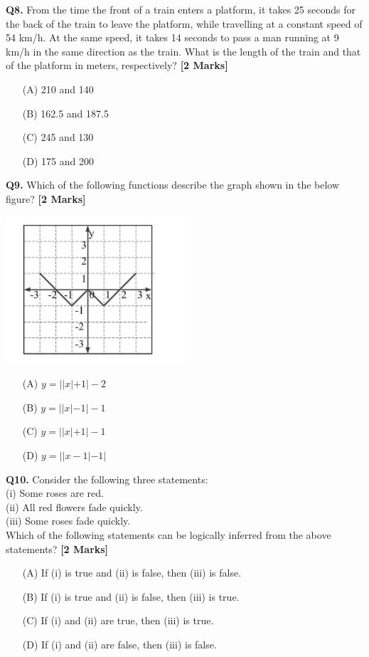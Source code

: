 \documentclass[11pt]{article}
\newcommand{\questionb}[2]{
    \noindent\textbf{Q#2.} #1 \hfill \textbf{[2 Marks]}
}
\begin{document}
\questionb{From the time the front of a train enters a platform, it takes 25 seconds for the back of the train to leave the platform, while travelling at a constant speed of 54 km/h. At the same speed, it takes 14 seconds to pass a man running at 9 km/h in the same direction as the train. What is the length of the train and that of the platform in meters, respectively?}{8}
\begin{enumerate}
    \item[(A)] 210 and 140
    \item[(B)] 162.5 and 187.5
    \item[(C)] 245 and 130
    \item[(D)] 175 and 200
\end{enumerate}
\vspace{0.5cm}

\questionb{Which of the following functions describe the graph shown in the below figure?}{9}
\begin{center}
\includegraphics[width=0.5\textwidth]{figures/9.png}
\end{center}
\begin{enumerate}
    \item[(A)] \( y = ||x| + 1| - 2 \)
    \item[(B)] \( y = ||x| - 1| - 1 \)
    \item[(C)] \( y = ||x| + 1| - 1 \)
    \item[(D)] \( y = ||x - 1| - 1| \)
\end{enumerate}
\vspace{0.5cm}

\questionb{Consider the following three statements: \\
(i) Some roses are red. \\
(ii) All red flowers fade quickly. \\
(iii) Some roses fade quickly. \\
Which of the following statements can be logically inferred from the above statements?}{10}
\begin{enumerate}
    \item[(A)] If (i) is true and (ii) is false, then (iii) is false.
    \item[(B)] If (i) is true and (ii) is false, then (iii) is true.
    \item[(C)] If (i) and (ii) are true, then (iii) is true.
    \item[(D)] If (i) and (ii) are false, then (iii) is false.
\end{enumerate}
\vspace{0.5cm}
\end{document}
